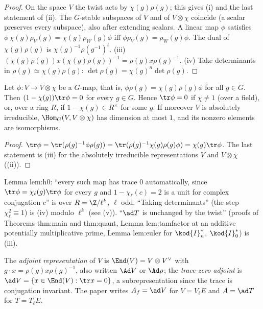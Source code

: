 \begin{proof}
On the space $V$ the twist acts by $\chi(g)\rho(g)$; this gives (i) and the last statement of (ii). The $G$-stable subspaces of $V$ and of
$V\otimes\chi$ coincide (a scalar preserves every subspace), also after extending scalars. A linear map $\phi$ satisfies
$\phi\,\chi(g)\rho_V(g)=\chi(g)\rho_W(g)\phi$ iff $\phi\rho_V(g)=\rho_W(g)\phi$. The dual of $\chi(g)\rho(g)$ is $\chi(g)^{-1}\rho(g^{-1})^t$. (iii)
$(\chi(g)\rho(g))x(\chi(g)\rho(g))^{-1}=\rho(g)x\rho(g)^{-1}$. (iv) Take determinants in $\rho(g)\simeq\chi(g)\rho(g)$: $\det\rho(g)=\chi(g)^n\det\rho(g)$.
\end{proof}

\begin{lemma}\label{lem:reps:trace-zero}
Let $\phi\colon V\to V\otimes\chi$ be a $G$-map, that is, $\phi\rho(g)=\chi(g)\rho(g)\phi$ for all $g\in G$. Then $(1-\chi(g))\tr\phi=0$ for every $g\in G$. Hence
$\tr\phi=0$ if $\chi\ne1$ (over a field), or, over a ring $R$, if $1-\chi(g)\in R^\times$ for some $g$. If moreover $V$ is absolutely irreducible,
$\Hom_G(V,V\otimes\chi)$ has dimension at most $1$, and its nonzero elements are isomorphisms.
\end{lemma}

\begin{proof}
$\tr\phi=\tr(\rho(g)^{-1}\phi\rho(g))=\tr(\rho(g)^{-1}\chi(g)\rho(g)\phi)=\chi(g)\tr\phi$. The last statement is (iii) for the absolutely
irreducible representations $V$ and $V\otimes\chi$ ((ii)).
\end{proof}

\begin{paperlink}
Lemma lem:h0: ``every such map has trace $0$ automatically, since $\tr\phi=\chi_\ell(g)\tr\phi$ for every $g$ and $1-\chi_\ell(c)=2$ is a unit for
complex conjugation $c$'' is  over $R=\Z/\ell^k$, $\ell$ odd. ``Taking determinants'' (the step $\chi_\ell^2\equiv1$) is
(iv) modulo $\ell^k$ (see (v)). ``$\ad T$ is unchanged by the twist'' (proofs of Theorems thm:main
and thm:quant, Lemma lem:tamfactor at an additive potentially multiplicative prime, Lemma lem:euler for $\kod{I}_n^*$, $\kod{I}_0^*$) is (iii).
\end{paperlink}

\begin{definition}\label{def:reps:adjoint}
The \emph{adjoint representation} of $V$ is $\End(V)=V\otimes V^\vee$ with $g\cdot x=\rho(g)x\rho(g)^{-1}$, also written $\Ad V$ or $\Ad\rho$; the \emph{trace-zero
adjoint} is $\ad V=\{x\in\End(V):\tr x=0\}$, a subrepresentation since the trace is conjugation invariant. The paper writes $A_f=\ad V$ for
$V=V_\ell E$ and $A=\ad T$ for $T=T_\ell E$.
\end{definition}

